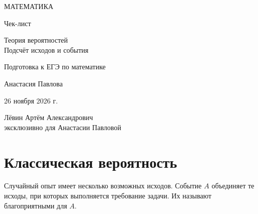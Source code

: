 \documentclass[a4paper,12pt]{article}
\begin{document}
\begin{titlepage}
\thispagestyle{empty}
\centering
\vspace*{28mm}
{\Large\color{darkaccent} МАТЕМАТИКА\par}
\vspace{14mm}
{\Huge Чек-лист\par}
\vspace{9mm}
{\LARGE\color{accent} Теория вероятностей\\[2mm] Подсчёт исходов и события\par}
\vspace{14mm}
{\large Подготовка к ЕГЭ по математике\par}
\vfill
{\large Анастасия Павлова\par}
\vspace{9mm}
26 ноября 2026 г.\par
\vspace{15mm}
{\small Лёвин Артём Александрович\\эксклюзивно для Анастасии Павловой\par}
\vspace{17mm}
\vspace*{8mm}
\end{titlepage}
\setcounter{page}{1}
\section{Классическая вероятность}
Случайный опыт имеет несколько возможных исходов. Событие $A$ объединяет те исходы, при которых выполняется требование задачи. Их называют благоприятными для $A$.
\end{document}
